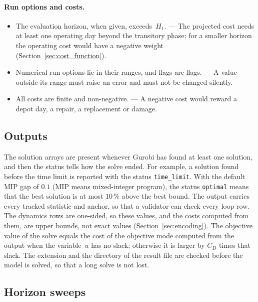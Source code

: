 \documentclass[11pt,a4paper]{article}
\theoremstyle{plain}
\theoremstyle{definition}
\theoremstyle{remark}
\begin{document}
\paragraph{Run options and costs.}
\begin{itemize}[nosep]
  \item The evaluation horizon, when given, exceeds~$H_1$. --- The projected cost needs at least one operating day beyond the transitory phase; for a smaller horizon the operating cost would have a negative weight (Section~\ref{sec:cost_function}).
  \item Numerical run options lie in their ranges, and flags are flags. --- A value outside its range must raise an error and must not be changed silently.
  \item All costs are finite and non-negative. --- A negative cost would reward a depot day, a repair, a replacement or damage.
\end{itemize}

\subsection{Outputs}
\label{sec:impl_outputs}

The solution arrays are present whenever Gurobi has found at least one solution, and then the status tells how the solve ended.
For example, a solution found before the time limit is reported with the status \texttt{time\_limit}.
With the default MIP gap of $0.1$ (MIP means mixed-integer program), the status \texttt{optimal} means that the best solution is at most $10\,\%$ above the best bound.
The output carries every tracked statistic and anchor, so that a validator can check every loop row.
The dynamics rows are one-sided, so these values, and the costs computed from them, are upper bounds, not exact values (Section~\ref{sec:encoding}).
The objective value of the solve equals the cost of the objective mode computed from the output when the variable~$u$ has no slack; otherwise it is larger by $C_D$ times that slack.
The extension and the directory of the result file are checked before the model is solved, so that a long solve is not lost.

\subsection{Horizon sweeps}
\label{sec:impl_sweeps}
\end{document}
